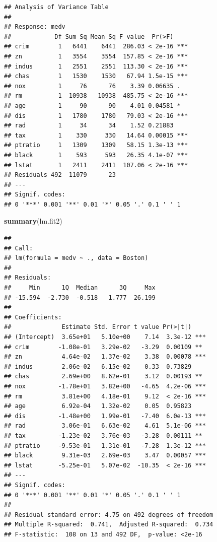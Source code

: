 \documentclass[
]{book}
\newenvironment{Shaded}{\begin{snugshade}}{\end{snugshade}}
\newcommand{\FunctionTok}[1]{\textcolor[rgb]{0.13,0.29,0.53}{\textbf{#1}}}
\newcommand{\NormalTok}[1]{#1}
\theoremstyle{definition}
\theoremstyle{definition}
\theoremstyle{definition}
\theoremstyle{definition}
\theoremstyle{remark}
\begin{document}
\begin{verbatim}
## Analysis of Variance Table
## 
## Response: medv
##            Df Sum Sq Mean Sq F value  Pr(>F)    
## crim        1   6441    6441  286.03 < 2e-16 ***
## zn          1   3554    3554  157.85 < 2e-16 ***
## indus       1   2551    2551  113.30 < 2e-16 ***
## chas        1   1530    1530   67.94 1.5e-15 ***
## nox         1     76      76    3.39 0.06635 .  
## rm          1  10938   10938  485.75 < 2e-16 ***
## age         1     90      90    4.01 0.04581 *  
## dis         1   1780    1780   79.03 < 2e-16 ***
## rad         1     34      34    1.52 0.21883    
## tax         1    330     330   14.64 0.00015 ***
## ptratio     1   1309    1309   58.15 1.3e-13 ***
## black       1    593     593   26.35 4.1e-07 ***
## lstat       1   2411    2411  107.06 < 2e-16 ***
## Residuals 492  11079      23                    
## ---
## Signif. codes:  
## 0 '***' 0.001 '**' 0.01 '*' 0.05 '.' 0.1 ' ' 1
\end{verbatim}

\begin{Shaded}
\begin{Highlighting}[]
\FunctionTok{summary}\NormalTok{(lm.fit2)}
\end{Highlighting}
\end{Shaded}

\begin{verbatim}
## 
## Call:
## lm(formula = medv ~ ., data = Boston)
## 
## Residuals:
##     Min      1Q  Median      3Q     Max 
## -15.594  -2.730  -0.518   1.777  26.199 
## 
## Coefficients:
##              Estimate Std. Error t value Pr(>|t|)    
## (Intercept)  3.65e+01   5.10e+00    7.14  3.3e-12 ***
## crim        -1.08e-01   3.29e-02   -3.29  0.00109 ** 
## zn           4.64e-02   1.37e-02    3.38  0.00078 ***
## indus        2.06e-02   6.15e-02    0.33  0.73829    
## chas         2.69e+00   8.62e-01    3.12  0.00193 ** 
## nox         -1.78e+01   3.82e+00   -4.65  4.2e-06 ***
## rm           3.81e+00   4.18e-01    9.12  < 2e-16 ***
## age          6.92e-04   1.32e-02    0.05  0.95823    
## dis         -1.48e+00   1.99e-01   -7.40  6.0e-13 ***
## rad          3.06e-01   6.63e-02    4.61  5.1e-06 ***
## tax         -1.23e-02   3.76e-03   -3.28  0.00111 ** 
## ptratio     -9.53e-01   1.31e-01   -7.28  1.3e-12 ***
## black        9.31e-03   2.69e-03    3.47  0.00057 ***
## lstat       -5.25e-01   5.07e-02  -10.35  < 2e-16 ***
## ---
## Signif. codes:  
## 0 '***' 0.001 '**' 0.01 '*' 0.05 '.' 0.1 ' ' 1
## 
## Residual standard error: 4.75 on 492 degrees of freedom
## Multiple R-squared:  0.741,  Adjusted R-squared:  0.734 
## F-statistic:  108 on 13 and 492 DF,  p-value: <2e-16
\end{verbatim}
\end{document}

